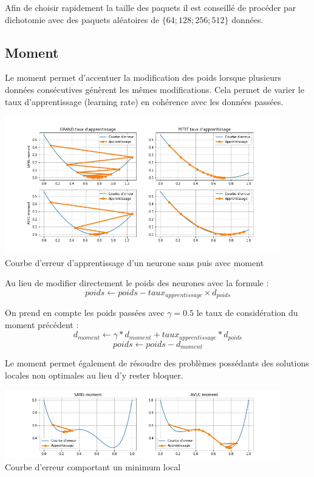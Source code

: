 \documentclass[12pt,a4paper, french]{article}
\begin{document}
Afin de choisir rapidement la taille des paquets il est conseillé de procéder par dichotomie avec des paquets aléatoires de $\{64; 128; 256; 512\}$ données.

\subsection{Moment}
Le moment permet d'accentuer la modification des poids lorsque plusieurs données consécutives génèrent les mêmes modifications. Cela permet de varier le taux d'apprentissage (learning rate) en cohérence avec les données passées.

\begin{center}
    \includegraphics[width=12cm]{2-Moment VS sans Moment.jpg} \\
    Courbe d'erreur d'apprentissage d'un neurone sans puis avec moment
\end{center}

Au lieu de modifier directement le poids des neurones avec la formule :
\begin{equation}
	poids \leftarrow
	poids - taux_{apprentissage} \times d_{poids}
\end{equation}

On prend en compte les poids passées avec $\gamma = 0.5$ le taux de considération du moment précédent :
\begin{equation}
	d_{moment} \leftarrow 
	\gamma * d_{moment} + taux_{apprentissage} * d_{poids}
\end{equation}
\begin{equation}
	poids \leftarrow
	poids - d_{moment}
\end{equation}


Le moment permet également de résoudre des problèmes possédants des solutions locales non optimales au lieu d'y rester bloquer.

\begin{center}
    \includegraphics[width=12cm]{2-Moment remonte.jpg} \\
    Courbe d'erreur comportant un minimum local
\end{center}
\end{document}
